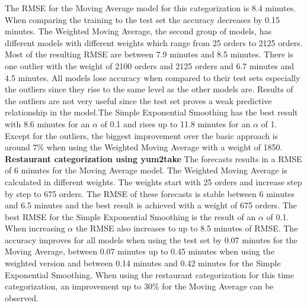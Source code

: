 The RMSE for the Moving Average model for this categorization is 8.4 minutes. When comparing the training to the test set the accuracy decreases by 0.15 minutes. The Weighted Moving Average, the second group of models, has different models with different weights which range from 25 orders to 2125 orders. Most of the resulting RMSE are between 7.9 minutes and 8.5 minutes. There is one outlier with the weight of 2100 orders and 2125 orders and 6.7 minutes and 4.5 minutes. All models lose accuracy when compared to their test sets especially the outliers since they rise to the same level as the other models are. Results of the outliers are not very useful since the test set proves a weak predictive relationship in the model.\newline The Simple Exponential Smoothing has the best result with 8.6 minutes for an $\alpha$ of 0.1 and rises up to 11.8 minutes for an $\alpha$ of 1.
Except for the outliers, the biggest improvement over the basic approach is around 7\% when using the Weighted Moving Average with a weight of 1850.
\newline\newline\textbf{Restaurant categorization using yum2take}\newline
The forecasts results in a RMSE of 6 minutes for the Moving Average model. The Weighted Moving Average is calculated in different weights. The weights start with 25 orders and increase step by step to 675 orders. The RMSE of these forecasts is stable between 6 minutes and 6.5 minutes and the best result is achieved with a weight of 675 orders. The best RMSE for the Simple Exponential Smoothing is the result of an $\alpha$ of 0.1. When increasing $\alpha$ the RMSE also increases to up to 8.5 minutes of RMSE. The accuracy improves for all models when using the test set by 0.07 minutes for the Moving Average, between 0.07 minutes up to 0.45 minutes when using the weighted version and between 0.14 minutes and 0.42 minutes for the Simple Exponential Smoothing.\newline
When using the restaurant categorization for this time categorization, an improvement up to 30\% for the Moving Average can be observed.
